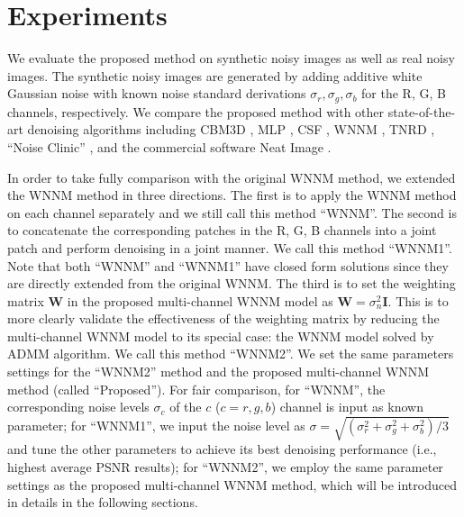 \documentclass[10pt,twocolumn,letterpaper,sort&compress]{article}
\begin{document}
\section{Experiments}
We evaluate the proposed method on synthetic noisy images as well as real noisy images. The synthetic noisy images are generated by adding additive white Gaussian noise with known noise standard derivations $\sigma_{r}, \sigma_{g}, \sigma_{b}$ for the R, G, B channels, respectively. We compare the proposed method with other state-of-the-art denoising algorithms including CBM3D \cite{bm3d,cbm3d}, MLP \cite{mlp}, CSF \cite{csf}, WNNM \cite{wnnm}, TNRD \cite{chen2015learning}, ``Noise Clinic'' \cite{noiseclinic,ncwebsite}, and the commercial software Neat Image \cite{neatimage}.

In order to take fully comparison with the original WNNM method, we extended the WNNM method \cite{wnnmijcv} in three directions. The first is to apply the WNNM method on each channel separately and we still call this method ``WNNM''. The second is to concatenate the corresponding patches in the R, G, B channels into a joint patch and perform denoising in a joint manner. We call this method ``WNNM1''. Note that both ``WNNM'' and ``WNNM1'' have closed form solutions since they are directly extended from the original WNNM. The third is to set the weighting matrix $\mathbf{W}$ in the proposed multi-channel WNNM model as $\mathbf{W}=\sigma_{n}^{2}\mathbf{I}$. This is to more clearly validate the effectiveness of the weighting matrix by reducing the multi-channel WNNM model to its special case: the WNNM model solved by ADMM algorithm. We call this method ``WNNM2''. We set the same parameters settings for the ``WNNM2'' method and the proposed multi-channel WNNM method (called ``Proposed''). For fair comparison, for ``WNNM'', the corresponding noise levels $\sigma_{c}$ of the $c$ ($c=r, g, b$) channel is input as known parameter;  for ``WNNM1'', we input the noise level as $\sigma = \sqrt{(\sigma_{r}^{2}+\sigma_{g}^{2}+\sigma_{b}^{2})/3}$ and tune the other parameters to achieve its best denoising performance (i.e., highest average PSNR results); for ``WNNM2'', we employ the same parameter settings as the proposed multi-channel WNNM method, which will be introduced in details in the following sections.
\end{document}
